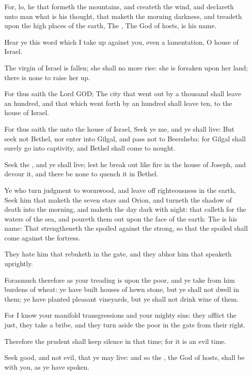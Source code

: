 \Verse For, lo, he that formeth the mountains, and createth the wind, and declareth unto man what is his thought, that maketh the morning darkness, and treadeth upon the high places of the earth, The \LORD, The God of hosts, is his name.


\Chapter
\Verse Hear ye this word which I take up against you, even a lamentation, O house of Israel.

\Verse The virgin of Israel is fallen; she shall no more rise: she is forsaken upon her land; there is none to raise her up.

\Verse For thus saith the Lord GOD; The city that went out by a thousand shall leave an hundred, and that which went forth by an hundred shall leave ten, to the house of Israel.

\Verse For thus saith the \LORD unto the house of Israel, Seek ye me, and ye shall live: \Verse But seek not Bethel, nor enter into Gilgal, and pass not to Beersheba: for Gilgal shall surely go into captivity, and Bethel shall come to nought.

\Verse Seek the \LORD, and ye shall live; lest he break out like fire in the house of Joseph, and devour it, and there be none to quench it in Bethel.

\Verse Ye who turn judgment to wormwood, and leave off righteousness in the earth, \Verse Seek him that maketh the seven stars and Orion, and turneth the shadow of death into the morning, and maketh the day dark with night: that calleth for the waters of the sea, and poureth them out upon the face of the earth: The \LORD is his name: \Verse That strengtheneth the spoiled against the strong, so that the spoiled shall come against the fortress.

\Verse They hate him that rebuketh in the gate, and they abhor him that speaketh uprightly.

\Verse Forasmuch therefore as your treading is upon the poor, and ye take from him burdens of wheat: ye have built houses of hewn stone, but ye shall not dwell in them; ye have planted pleasant vineyards, but ye shall not drink wine of them.

\Verse For I know your manifold transgressions and your mighty sins: they afflict the just, they take a bribe, and they turn aside the poor in the gate from their right.

\Verse Therefore the prudent shall keep silence in that time; for it is an evil time.

\Verse Seek good, and not evil, that ye may live: and so the \LORD, the God of hosts, shall be with you, as ye have spoken.

